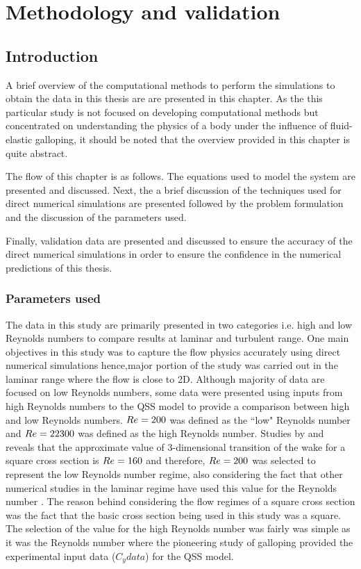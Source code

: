 
\chapter{Methodology and validation}

\section{Introduction}
 
A brief overview of the computational methods to perform the simulations to obtain the data in this thesis are are presented in this chapter. As the this particular study is not focused on developing computational methods but concentrated on understanding the physics of a body under the influence of fluid-elastic galloping, it should be noted that the overview provided in this chapter is quite abstract.

The flow of this chapter is as follows. The equations used to model the system are presented and discussed. Next, the a brief discussion of the techniques used for direct numerical simulations are presented followed by the problem formulation and the discussion of the parameters used. 

Finally, validation data are presented and discussed to ensure the accuracy of the direct numerical simulations in order to ensure the confidence in the numerical predictions of this thesis.


\subsection{Parameters used}

The data in this study are primarily presented in two categories i.e. high and low Reynolds numbers to compare results at laminar and turbulent range. One main objectives in this study was to capture the flow physics accurately using direct numerical simulations hence,major portion of the study was carried out in the laminar range where the flow is close to 2D. Although majority of data are focused on low Reynolds numbers, some data were presented using inputs from high Reynolds numbers to the QSS model to provide a comparison between high and low Reynolds numbers. $Re=200$ was defined as the ``low" Reynolds number and $Re=22300$ was defined as the high Reynolds number. Studies by \citet{tong2008} and \citet{sheard2009} reveals that the approximate value of 3-dimensional transition of the wake for a square cross section is $Re=160$ and therefore, $Re=200$ was selected to represent the low Reynolds number regime, also considering the fact that other numerical studies in the laminar regime have used this value for the Reynolds number \citep{Robertson2003,Joly2012}. The reason behind considering the flow regimes of a square cross section was the fact that the basic cross section being used in this study was a square. The selection of the value for the high Reynolds number was fairly was simple as it was the Reynolds number where the pioneering study of galloping \citet{Parkinson1964} provided the experimental input data ($C_y data$) for the QSS model. 


